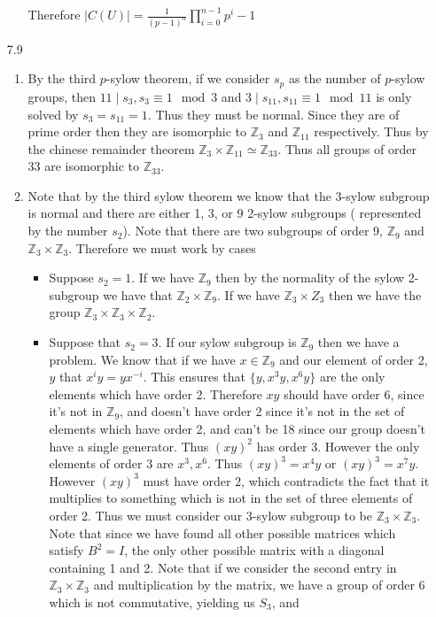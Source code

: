 \documentclass[12pt, letterpaper]{article}
\newcommand{\Z}{\mathbb{Z}}
\begin{document}
\begin{enumerate}
\begin{itemize}
		Therefore $|C(U)| = \frac{1}{(p-1)^n} \prod_{i=0}^{n-1}p^i - 1$
	\end{itemize}
	\item[7.9]
	\begin{enumerate}
		\item By the third $p$-sylow theorem, if we consider $s_p$ as the
		number of $p$-sylow groups, then $11 \mid s_3, s_3 \equiv 1 \mod{3}$ 
		and $3 \mid s_{11}, s_{11} \equiv 1 \mod{11}$ is only solved by $s_3 = s_{11} = 1$.  Thus they must be normal.  Since they are of prime order 
		then they are isomorphic to $\Z_3$ and $\Z_{11}$ respectively.
		Thus by the chinese remainder theorem $\Z_3 \times \Z_{11} \simeq \Z_{33}$.  Thus all groups of order $33$ are isomorphic to $\Z_{33}$.
		\item Note that by the third sylow theorem we know that the 3-sylow 
		subgroup is normal and there are either 1, 3, or 9 2-sylow subgroups (
		represented by the number $s_2$). 
		Note that there are two subgroups of order 9, 
		$\Z_9$ and $\Z_3 \times \Z_3$.  Therefore we must work by cases
		\begin{itemize}
			\item Suppose $s_2 = 1$.  If we have $\Z_9$ then by the normality of 
			the sylow 2-subgroup we have that $\Z_2 \times \Z_9$.  If we have 
			$\Z_3 \times Z_3$ then we have the group $\Z_3 \times \Z_3 \times \Z_2$.  
			\item Suppose that $s_2 = 3$.  If our sylow subgroup is $\Z_9$
			then we have a problem.  We know that if we have $x \in \Z_9$ and 
			our element of order 2, $y$ that $x^iy = yx^{-i}$.  This ensures that 
			$\{y,x^3y,x^6y\}$ are the only elements which have order 2.  
			Therefore $xy$ should have order 6, since it's not in $\Z_9$, and 
			doesn't have order 2 since it's not in the set of elements which have
			order 2, and can't be 18 since our group doesn't have a single 
			generator.  Thus $(xy)^2$ has order 3.  However the only elements 
			of order 3 are $x^3, x^6$.  Thus $(xy)^3 = x^4y$ or $(xy)^3 = x^7y$.
			However $(xy)^3$ must have order 2, which contradicts the fact that
			it multiplies to something which is not in the set of three elements 
			of order 2.  Thus we must consider our 3-sylow subgroup to be 
			$\Z_3 \times \Z_3$.  
			Note that since we have found all other possible matrices which
			satisfy $B^2 = I$, the only other possible matrix with a diagonal
			containing 1 and 2.   Note that if we consider the second entry 
			in $\Z_3 \times \Z_3$ and multiplication by the matrix, we have a 
			group of order 6 which is not commutative, yielding us $S_3$, and 

\end{itemize}
\end{enumerate}
\end{enumerate}
\end{document}
